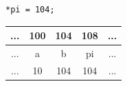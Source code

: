 \documentclass{beamer}
\begin{document}
\begin{frame}[fragile]
\begin{columns}[t]
\begin{column}{0.5\textwidth}
\begin{center}
\begin{tabular}{c | c | c | c | c}
\end{tabular}
\end{center}

\pause

\begin{flushleft}
\begin{lstlisting}
*pi = 104; 
\end{lstlisting}
\end{flushleft}

\begin{center}
  
\pause

\begin{tabular}{c | c | c | c | c}
... & 100 & 104 & 108 & ...\\\hline
... & a   & b   & pi  & ... \\\hline
... & 10  & \alert{104}   & 104 & ... \\
  
\end{tabular}
\end{center}
  \end{column}
\end{columns}



\end{frame}
\end{document}
